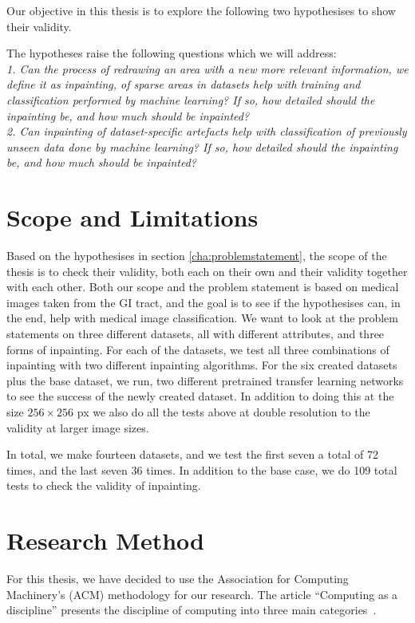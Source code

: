 Our objective in this thesis is to explore the following two hypothesises to show their validity.

The hypotheses raise the following questions which we will address:\\

\textit{1. Can the process of redrawing an area with a new more relevant information, we define it as inpainting, of sparse areas in datasets help with training and classification performed by machine learning? If so, how detailed should the inpainting be, and how much should be inpainted?}\\

\textit{2. Can inpainting of dataset-specific artefacts help with classification of previously unseen data done by machine learning? If so, how detailed should the inpainting be, and how much should be inpainted?}


\section{Scope and Limitations}
Based on the hypothesises in section \ref{cha:problemstatement}, the scope of the thesis is to check their validity, both each on their own and their validity together with each other. 
Both our scope and the problem statement is based on medical images taken from the GI tract, and the goal is to see if the hypothesises can, in the end, help with medical image classification.
We want to look at the problem statements on three different datasets, all with different attributes, and three forms of inpainting.
For each of the datasets, we test all three combinations of inpainting with two different inpainting algorithms. 
For the six created datasets plus the base dataset, we run, two different pretrained transfer learning networks to see the success of the newly created dataset.
In addition to doing this at the size $256 \times 256$ px we also do all the tests above at double resolution to the validity at larger image sizes.

In total, we make fourteen datasets, and we test the first seven a total of 72 times, and the last seven 36 times. In addition to the base case, we do 109 total tests to check the validity of inpainting.



\section{Research Method}
For this thesis, we have decided to use the Association for Computing Machinery's (ACM) methodology for our research. The article ``Computing as a discipline'' presents the discipline of computing into three main categories~\cite{Denning:1989:CD:63238.63239}. 
